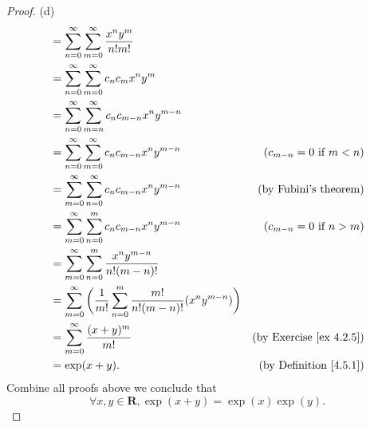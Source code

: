 \begin{proof}{(d)}
\begin{align*}
         & = \sum_{n = 0}^\infty \sum_{m = 0}^\infty \frac{x^n y^m}{n! m!}                                                                            \\
         & = \sum_{n = 0}^\infty \sum_{m = 0}^\infty c_n c_m x^n y^m                                                                                  \\
         & = \sum_{n = 0}^\infty \sum_{m = n}^\infty c_n c_{m - n} x^n y^{m - n}                                                                      \\
         & = \sum_{n = 0}^\infty \sum_{m = 0}^\infty c_n c_{m - n} x^n y^{m - n}                                & (c_{m - n} = 0 \text{ if } m < n)   \\
         & = \sum_{m = 0}^\infty \sum_{n = 0}^\infty c_n c_{m - n} x^n y^{m - n}                                & \text{(by Fubini's theorem)}        \\
         & = \sum_{m = 0}^\infty \sum_{n = 0}^m c_n c_{m - n} x^n y^{m - n}                                     & (c_{m - n} = 0 \text{ if } n > m)   \\
         & = \sum_{m = 0}^\infty \sum_{n = 0}^m \frac{x^n y^{m - n}}{n! (m - n)!}                                                                     \\
         & = \sum_{m = 0}^\infty \bigg(\frac{1}{m!} \sum_{n = 0}^m \frac{m!}{n! (m - n)!} (x^n y^{m - n})\bigg)                                       \\
         & = \sum_{m = 0}^\infty \frac{(x + y)^m}{m!}                                                           & \text{(by Exercise \ref{ex 4.2.5})} \\
         & = \exp(x + y).                                                                                       & \text{(by Definition \ref{4.5.1})}
    \end{align*}
    Combine all proofs above we conclude that
    \[
        \forall x, y \in \mathbf{R}, \exp(x + y) = \exp(x) \exp(y).
    \]
\end{proof}


